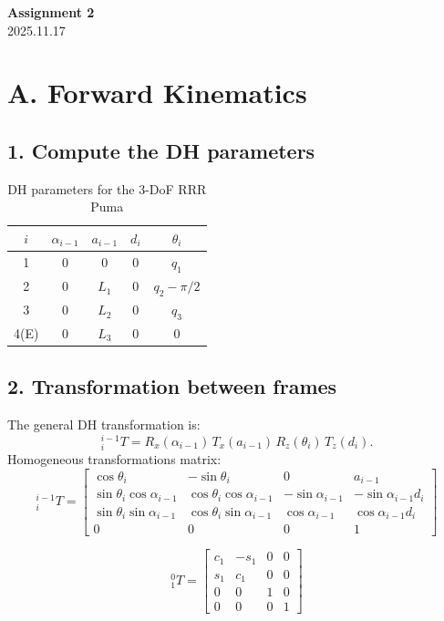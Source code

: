 \documentclass[a4paper,12pt]{article}
\begin{document}
\begin{center}
    \Large \textbf{Assignment 2} \\[6pt]
    2025.11.17
\end{center}

\section*{A. Forward Kinematics }
\subsection*{1. Compute the DH parameters}
\begin{table}[h!]
\centering
\begin{tabular}{c|c|c|c|c}
\hline
$i$ & $\alpha_{i-1}$ & $a_{i-1}$ & $d_i$ & $\theta_i$ \\ \hline
1   &       0        &     0     &   0   &   $q_1$    \\ \hline
2   &       0        &   $L_1$   &   0   & $q_2 - \pi/2$ \\ \hline
3   &       0        &   $L_2$   &   0   &   $q_3$    \\ \hline
4(E) &      0        &   $L_3$   &   0   &      0     \\ \hline
\end{tabular}
\caption{DH parameters for the 3-DoF RRR Puma}
\end{table}

\subsection*{2. Transformation between frames}
The general DH transformation is:
\[
{}^{i-1}_{i}T =
R_x(\alpha_{i-1})\, T_x(a_{i-1})\, R_z(\theta_i)\, T_z(d_i).
\]
Homogeneous transformations matrix:
\[
{}^{i-1}_{i}T =
\begin{bmatrix}
\cos\theta_i & -\sin\theta_i & 0 & a_{i-1} \\
\sin\theta_i \cos\alpha_{i-1} &
\cos\theta_i \cos\alpha_{i-1} &
-\sin\alpha_{i-1} &
-\sin\alpha_{i-1} d_i \\
\sin\theta_i \sin\alpha_{i-1} &
\cos\theta_i \sin\alpha_{i-1} &
\cos\alpha_{i-1} &
\cos\alpha_{i-1} d_i \\
0 & 0 & 0 & 1
\end{bmatrix}
\]

\[
{}^{0}_{1}T=
\begin{bmatrix}
c_1 & -s_1 & 0 & 0 \\
s_1 & c_1 & 0 & 0 \\
0 & 0 & 1 & 0\\
0&0&0&1
\end{bmatrix}
\]
\end{document}
